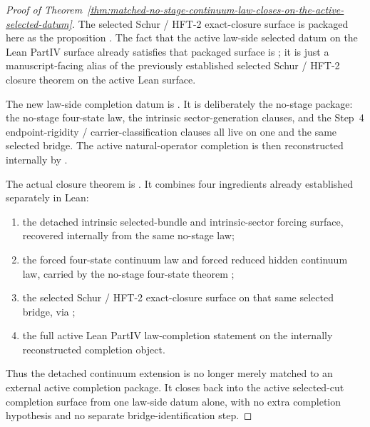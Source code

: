 \begin{proof}[Proof of Theorem~\ref{thm:matched-no-stage-continuum-law-closes-on-the-active-selected-datum}]
\label{proof:thm:matched-no-stage-continuum-law-closes-on-the-active-selected-datum}
The selected Schur / HFT-2 exact-closure surface is packaged here as the
proposition
. The fact that the active
law-side selected datum on the Lean PartIV surface already satisfies that
packaged surface is
; it is just a manuscript-facing
alias of the previously established selected Schur / HFT-2 closure theorem on
the active Lean surface.

The new law-side completion datum is
. It is deliberately the
no-stage package: the no-stage four-state law, the intrinsic sector-generation
clauses, and the Step~4 endpoint-rigidity / carrier-classification clauses all
live on one and the same selected bridge. The active natural-operator
completion is then reconstructed internally by
.

The actual closure theorem is
. It
combines four ingredients already established separately in Lean:
\begin{enumerate}
\item the detached intrinsic selected-bundle and intrinsic-sector forcing
      surface, recovered internally from the same no-stage law;
\item the forced four-state continuum law and forced reduced hidden continuum
      law, carried by the no-stage four-state theorem
      ;
\item the selected Schur / HFT-2 exact-closure surface on that same selected
      bridge, via ;
\item the full active Lean PartIV law-completion statement on the internally
      reconstructed completion object.
\end{enumerate}
Thus the detached continuum extension is no longer merely matched to an
external active completion package. It closes back into the active selected-cut
completion surface from one law-side datum alone, with no extra completion
hypothesis and no separate bridge-identification step.
\end{proof}

